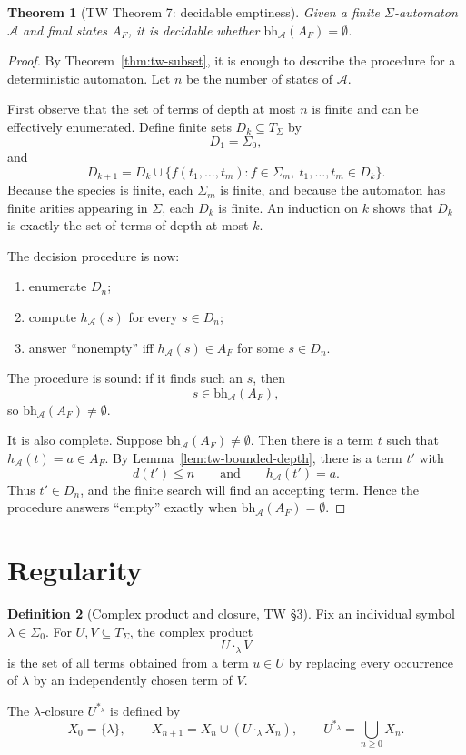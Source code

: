 \documentclass[11pt]{article}
\newtheorem{theorem}{Theorem}
\theoremstyle{definition}
\newtheorem{definition}[theorem]{Definition}
\newcommand{\SigmaSym}{\Sigma}
\newcommand{\Term}[1]{T_{#1}}
\newcommand{\Aut}{\mathcal A}
\newcommand{\bh}{\mathrm{bh}}
\begin{document}
\begin{theorem}[TW Theorem 7: decidable emptiness]\label{thm:tw-emptiness}
Given a finite \(\SigmaSym\)-automaton \(\Aut\) and final states \(A_F\), it is
decidable whether \(\bh_\Aut(A_F)=\emptyset\).
\end{theorem}

\begin{proof}
By Theorem~\ref{thm:tw-subset}, it is enough to describe the procedure for a
deterministic automaton.  Let \(n\) be the number of states of \(\Aut\).

First observe that the set of terms of depth at most \(n\) is finite and can be
effectively enumerated.  Define finite sets \(D_k\subseteq\Term{\SigmaSym}\) by
\[
  D_1=\SigmaSym_0,
\]
and
\[
  D_{k+1}
  =
  D_k\cup
  \{f(t_1,\ldots,t_m):
    f\in\SigmaSym_m,\ t_1,\ldots,t_m\in D_k\}.
\]
Because the species is finite, each \(\SigmaSym_m\) is finite, and because the
automaton has finite arities appearing in \(\SigmaSym\), each \(D_k\) is finite.
An induction on \(k\) shows that \(D_k\) is exactly the set of terms of depth at
most \(k\).

The decision procedure is now:
\begin{enumerate}[leftmargin=*]
  \item enumerate \(D_n\);
  \item compute \(h_\Aut(s)\) for every \(s\in D_n\);
  \item answer ``nonempty'' iff \(h_\Aut(s)\in A_F\) for some \(s\in D_n\).
\end{enumerate}

The procedure is sound: if it finds such an \(s\), then
\[
  s\in\bh_\Aut(A_F),
\]
so \(\bh_\Aut(A_F)\neq\emptyset\).

It is also complete.  Suppose \(\bh_\Aut(A_F)\neq\emptyset\).  Then there is a
term \(t\) such that \(h_\Aut(t)=a\in A_F\).  By
Lemma~\ref{lem:tw-bounded-depth}, there is a term \(t'\) with
\[
  d(t')\le n
  \qquad\text{and}\qquad
  h_\Aut(t')=a.
\]
Thus \(t'\in D_n\), and the finite search will find an accepting term.  Hence
the procedure answers ``empty'' exactly when \(\bh_\Aut(A_F)=\emptyset\).
\end{proof}

\section{Regularity}

\begin{definition}[Complex product and closure, TW \S3]
Fix an individual symbol \(\lambda\in\SigmaSym_0\).  For
\(U,V\subseteq\Term{\SigmaSym}\), the complex product
\[
  U\cdot_\lambda V
\]
is the set of all terms obtained from a term \(u\in U\) by replacing every
occurrence of \(\lambda\) by an independently chosen term of \(V\).

The \(\lambda\)-closure \(U^{*_\lambda}\) is defined by
\[
  X_0=\{\lambda\}, \qquad
  X_{n+1}=X_n\cup(U\cdot_\lambda X_n), \qquad
  U^{*_\lambda}=\bigcup_{n\ge0}X_n.
\]
\end{definition}
\end{document}
